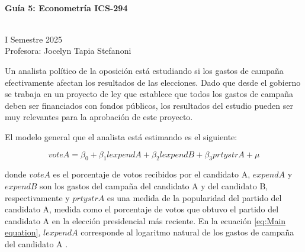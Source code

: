 \documentclass[10pt,a4paper]{article}
\begin{document}
\vspace{5cm}



\begin{center}
\begin{large}
\textbf{\\Guía 5: Econometría ICS-294}
\end{large}\\
\vspace{0.2cm}
I Semestre 2025\\
Profesora: Jocelyn Tapia Stefanoni\\
\end{center}


Un analista político de la oposición está estudiando si los gastos
de campaña efectivamente afectan los resultados de las elecciones.
Dado que desde el gobierno se trabaja en un proyecto de ley que establece
que todos los gastos de campaña deben ser financiados con fondos públicos,
los resultados del estudio pueden ser muy relevantes para la aprobación
de este proyecto.

El modelo general que el analista está estimando es el siguiente:

\begin{equation}
voteA=\beta_{0}+\beta_{1}lexpendA+\beta_{2}lexpendB+\beta_{3}prtystrA+\mu\label{eq:Main equation}
\end{equation}

donde $voteA$ es el porcentaje de votos recibidos por el candidato
A, $expendA$ y $expendB$ son los gastos del campaña del candidato
A y del candidato B, respectivamente y $prtystrA$ es una medida de
la popularidad del partido del candidato A, medida como el porcentaje
de votos que obtuvo el partido del candidato A en la elección presidencial
más reciente. En la ecuación \eqref{eq:Main equation}, $lexpendA$
corresponde al logaritmo natural de los gastos de campaña del candidato
A . %
\end{document}
